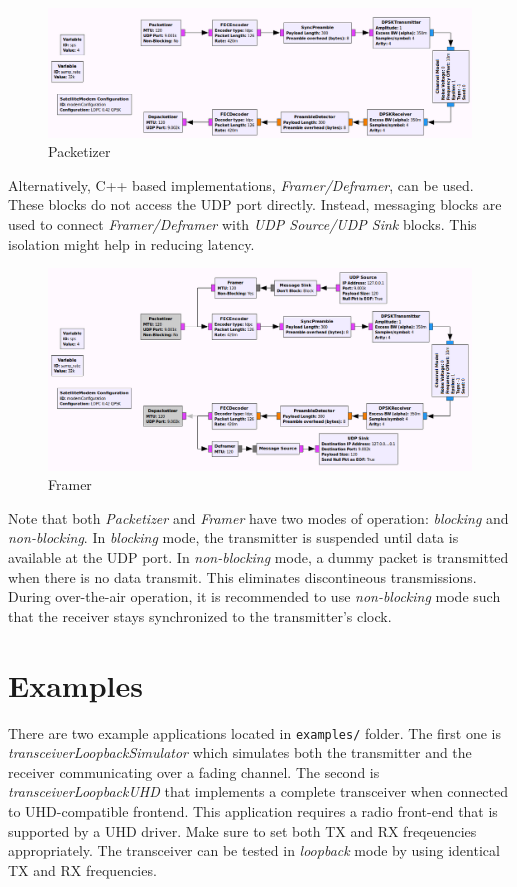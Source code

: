 \documentclass[peerreview,onecolumn]{IEEEtran}
\begin{document}
\begin{figure}[h]
\centering
\includegraphics[width=0.5\columnwidth]{Images/framing1} 
\caption{Packetizer}
\label{fig_framing}
\end{figure}

Alternatively, C++ based implementations, \emph{Framer/Deframer}, can be used. These blocks do not access the UDP port directly. Instead, messaging blocks are used to connect \emph{Framer/Deframer} with \emph{UDP Source/UDP Sink} blocks. This isolation might help in reducing latency.
\begin{figure}[h]
\centering
\includegraphics[width=0.5\columnwidth]{Images/framing2} 
\caption{Framer}
\label{fig_framing}
\end{figure}
Note that both \emph{Packetizer} and \emph{Framer} have two modes of operation: \emph{blocking} and \emph{non-blocking}. In \emph{blocking} mode, the transmitter is suspended until data is available at the UDP port. In \emph{non-blocking} mode, a dummy packet is transmitted when there is no data transmit. This eliminates discontineous transmissions. During over-the-air operation, it is recommended to use \emph{non-blocking} mode such that the receiver stays synchronized to the transmitter's clock.

\section{Examples}
There are two example applications located in \texttt{examples/} folder. The first one is \emph{transceiverLoopbackSimulator} which simulates both the transmitter and the receiver communicating over a fading channel. The second is \emph{transceiverLoopbackUHD} that implements a complete transceiver when connected to UHD-compatible frontend. This application requires a radio front-end that is supported by a UHD driver. Make sure to set both TX and RX freqeuencies appropriately. The transceiver can be tested in \emph{loopback} mode by using identical TX and RX frequencies.

%






\end{document}
